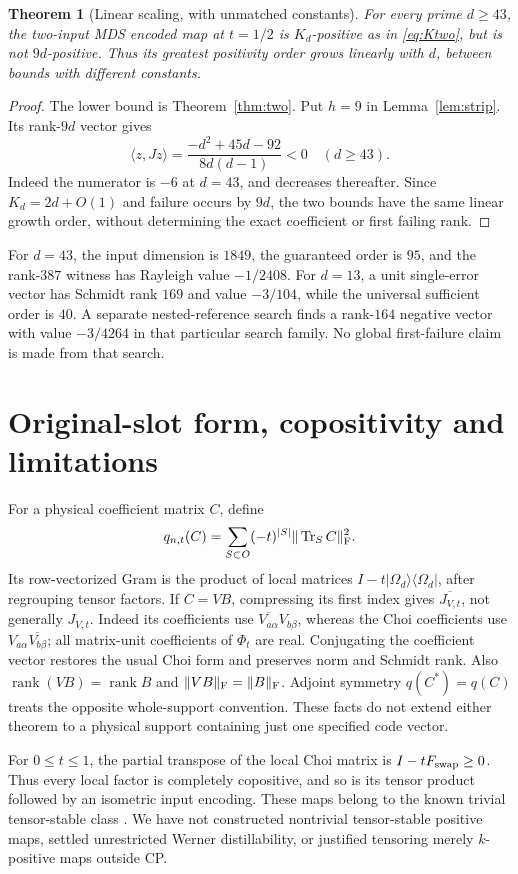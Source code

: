 \documentclass[11pt,a4paper]{article}
\newtheorem{theorem}{Theorem}
\newcommand{\Tr}{\operatorname{Tr}}
\newcommand{\rank}{\operatorname{rank}}
\begin{document}
\begin{theorem}[Linear scaling, with unmatched constants]\label{thm:linear}
For every prime \(d\ge43\), the two-input MDS encoded map at \(t=1/2\) is \(K_d\)-positive as in \eqref{eq:Ktwo}, but is not \(9d\)-positive. Thus its greatest positivity order grows linearly with \(d\), between bounds with different constants.
\end{theorem}
\begin{proof}
The lower bound is Theorem~\ref{thm:two}. Put \(h=9\) in Lemma~\ref{lem:strip}. Its rank-\(9d\) vector gives
\[
 \langle z,Jz\rangle
   =\frac{-d^2+45d-92}{8d(d-1)}<0\quad(d\ge43).
\]
Indeed the numerator is \(-6\) at \(d=43\), and decreases thereafter. Since \(K_d=2d+O(1)\) and failure occurs by \(9d\), the two bounds have the same linear growth order, without determining the exact coefficient or first failing rank.
\end{proof}
For \(d=43\), the input dimension is \(1849\), the guaranteed order is \(95\), and the rank-\(387\) witness has Rayleigh value \(-1/2408\). For \(d=13\), a unit single-error vector has Schmidt rank \(169\) and value \(-3/104\), while the universal sufficient order is \(40\). A separate nested-reference search finds a rank-\(164\) negative vector with value \(-3/4264\) in that particular search family. No global first-failure claim is made from that search.

\section{Original-slot form, copositivity and limitations}
For a physical coefficient matrix \(C\), define
\[
 q_{n,t}(C)=\sum_{S\subset O}(-t)^{|S|}\|\Tr_S C\|_{\rm F}^2 .
\]
Its row-vectorized Gram is the product of local matrices
\(I-t|\Omega_d\rangle\langle\Omega_d|\), after regrouping tensor factors.
If \(C=VB\), compressing its first index gives \(\overline{J_{V,t}}\), not generally \(J_{V,t}\). Indeed its coefficients use
\(\overline{V_{a\alpha}}V_{b\beta}\), whereas the Choi coefficients use
\(V_{a\alpha}\overline{V_{b\beta}}\); all matrix-unit coefficients of \(\Phi_t\) are real. Conjugating the coefficient vector restores the usual Choi form and preserves norm and Schmidt rank. Also \(\rank(VB)=\rank B\) and \(\|VB\|_{\rm F}=\|B\|_{\rm F}\). Adjoint symmetry \(q(C^*)=q(C)\) treats the opposite whole-support convention. These facts do not extend either theorem to a physical support containing just one specified code vector.

For \(0\le t\le1\), the partial transpose of the local Choi matrix is \(I-tF_{\rm swap}\ge0\). Thus every local factor is completely copositive, and so is its tensor product followed by an isometric input encoding. These maps belong to the known trivial tensor-stable class \cite{MHRW}. We have not constructed nontrivial tensor-stable positive maps, settled unrestricted Werner distillability, or justified tensoring merely \(k\)-positive maps outside CP.
\end{document}
